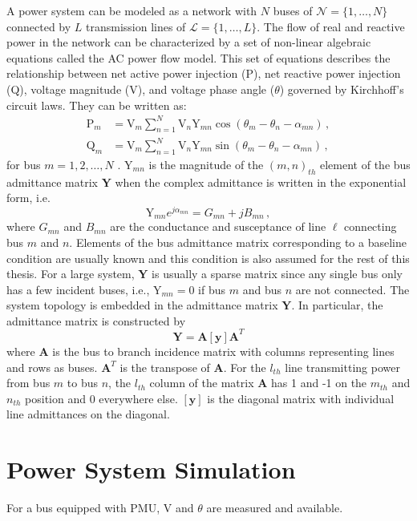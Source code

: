A power system can be modeled as a network with $N$ buses of $\mathcal{N} = \{1, \dots, N\}$ connected by $L$ transmission lines of $\mathcal{L} = \{1, \dots, L\}$. The flow of real and reactive power in the network can be characterized by a set of non-linear algebraic equations called the AC power flow model. This set of equations describes the relationship between net active power injection (P), net reactive power injection (Q), voltage magnitude (V), and voltage phase angle ($\theta$) governed by Kirchhoff's circuit laws. They can be written as:
\begin{subequations}
\label{eqn:AC_power_flow_model}
\begin{align}
\text{P}_m &= \text{V}_m \sum_{n=1}^{N} \text{V}_n \text{Y}_{mn} \cos (\theta_m - \theta_n - \alpha_{mn}) \,, \label{eqn:AC_power_flow_P}\\
\text{Q}_m &= \text{V}_m \sum_{n=1}^{N} \text{V}_n \text{Y}_{mn} \sin (\theta_m - \theta_n - \alpha_{mn}) \,, \label{eqn:AC_power_flow_Q}
\end{align}
\end{subequations}
for bus $m = 1, 2, \dots, N$ \cite{Glover2012}. Y$_{mn}$ is the magnitude of the $(m,n)_{th}$ element of the bus admittance matrix $\boldsymbol{Y}$ when the complex admittance is written in the exponential form, i.e. 
\begin{equation}
\label{eqn:admittance_expression}
\text{Y}_{mn}e^{j\alpha_{mn}} = G_{mn} + jB_{mn} \,,
\end{equation}
where $G_{mn}$ and $B_{mn}$ are the conductance and susceptance of line $\ell$ connecting bus $m$ and $n$. Elements of the bus admittance matrix corresponding to a baseline condition are usually known and this condition is also assumed for the rest of this thesis. For a large system, $\boldsymbol{Y}$ is usually a sparse matrix since any single bus only has a few incident buses, i.e., Y$_{mn} = 0$ if bus $m$ and bus $n$ are not connected. The system topology is embedded in the admittance matrix $\boldsymbol{Y}$. In particular, the admittance matrix is constructed by 
\begin{equation}
\label{eqn:admittance_matrix}
\boldsymbol{Y} = \mathbf{A [y] A}^{T}
\end{equation} where $\mathbf{A}$ is the bus to branch incidence matrix with columns representing lines and rows as buses. $\mathbf{A}^T$ is the transpose of $\mathbf{A}$. For the $l_{th}$ line transmitting power from bus $m$ to bus $n$, the $l_{th}$ column of the matrix $\mathbf{A}$ has 1 and -1 on the $m_{th}$ and $n_{th}$ position and 0 everywhere else. $\mathbf{[y]}$ is the diagonal matrix with individual line admittances on the diagonal.


\section{Power System Simulation}
\label{ch2:sec:simulation}




For a bus equipped with PMU, V and $\theta$ are measured and available. 